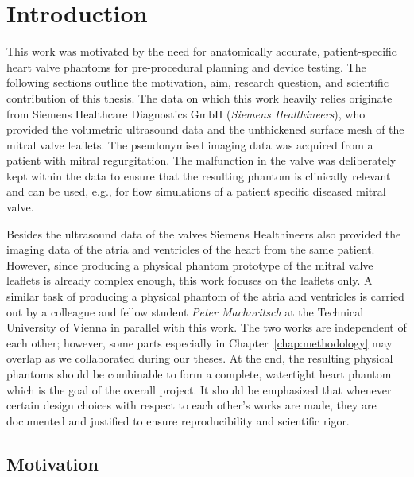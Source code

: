 \chapter{Introduction}\label{chap:introduction}
This work was motivated by the need for anatomically accurate, patient-specific heart valve phantoms for pre-procedural planning and device testing. The following sections outline the motivation, aim, research question, and scientific contribution of this thesis. The data on which this work heavily relies originate from Siemens Healthcare Diagnostics GmbH (\emph{Siemens Healthineers}), who provided the volumetric ultrasound data and the unthickened surface mesh of the mitral valve leaflets. The pseudonymised imaging data was acquired from a patient with mitral regurgitation. The malfunction in the valve was deliberately kept within the data to ensure that the resulting phantom is clinically relevant and can be used, e.g., for flow simulations of a patient specific diseased mitral valve. 

Besides the ultrasound data of the valves Siemens Healthineers also provided the imaging data of the atria and ventricles of the heart from the same patient. However, since producing a physical phantom prototype of the mitral valve leaflets is already complex enough, this work focuses on the leaflets only. A similar task of producing a physical phantom of the atria and ventricles is carried out by a colleague and fellow student \emph{Peter Machoritsch} at the Technical University of Vienna in parallel with this work. The two works are independent of each other; however, some parts especially in Chapter~\ref{chap:methodology} may overlap as we collaborated during our theses. At the end, the resulting physical phantoms should be combinable to form a complete, watertight heart phantom which is the goal of the overall project. It should be emphasized that whenever certain design choices with respect to each other's works are made, they are documented and justified to ensure reproducibility and scientific rigor. 


\section{Motivation}\label{sec:intro_motivation}

